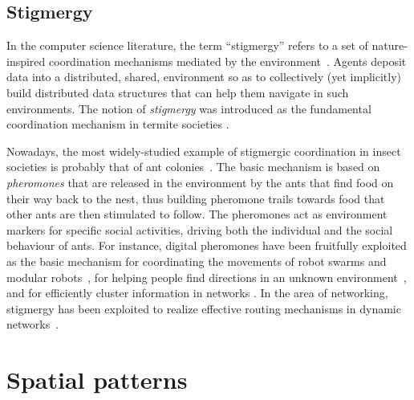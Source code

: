 \documentclass[12pt,a4paper,twoside,openright]{book}
\begin{document}
\subsection{Stigmergy}

In the computer science literature, the term ``stigmergy'' refers to a set of nature-inspired coordination mechanisms mediated by the environment~\cite{stigmergyhistory-artificiallife5,stigmergy-artificiallife5}.
%
Agents deposit data into a distributed, shared, environment so as to collectively (yet implicitly) build distributed data structures that can help them navigate in such environments.
%
The notion of \emph{stigmergy} was introduced as the fundamental coordination mechanism in termite societies \cite{stigmergy-grasse59}.

Nowadays, the most widely-studied example of stigmergic coordination in insect societies is probably that of ant colonies~\cite{dorigo-aco2004}.
%
The basic mechanism is based on \emph{pheromones} that are released in the environment by the ants that find food on their way back to the nest, thus building pheromone trails towards food that other ants are then stimulated to follow.
%
The pheromones act as environment markers for specific social activities, driving both the individual and the social behaviour of ants.
%
For instance, digital pheromones \cite{pheromoncoord-aamas2002,stigmergy-e4masII} have been fruitfully exploited as the basic mechanism for coordinating the movements of robot swarms and modular robots~\cite{tota-aamas2005}, for helping people find directions in an unknown environment~\cite{MameiZ07}, and for efficiently cluster information in networks \cite{collectivesort-scico74,wordNet}.
%
In the area of networking, stigmergy has been exploited to realize effective routing mechanisms in dynamic networks~\cite{swarmintelligence-book1999,AC-Survey}.

\section{Spatial patterns}
\end{document}
